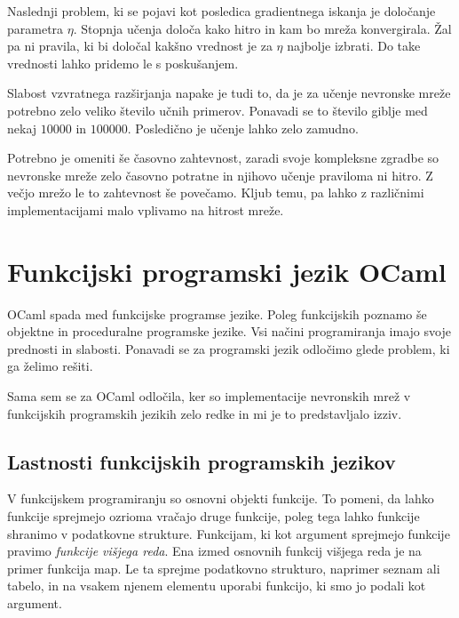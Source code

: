 \documentclass[mat1]{fmfdelo}
\begin{document}
Naslednji problem, ki se pojavi kot posledica gradientnega iskanja je določanje parametra $\eta$. Stopnja učenja določa kako hitro in kam bo mreža konvergirala. Žal pa ni pravila, ki bi določal kakšno vrednost je za $\eta$ najbolje izbrati. Do take vrednosti lahko pridemo le s poskušanjem.

Slabost vzvratnega razširjanja napake je tudi to, da je za učenje nevronske mreže potrebno zelo veliko število učnih primerov. Ponavadi se to število giblje med nekaj $10000$ in $100000$. Posledično je učenje lahko zelo zamudno.

Potrebno je omeniti še časovno zahtevnost, zaradi svoje kompleksne zgradbe so nevronske mreže zelo časovno potratne in njihovo učenje praviloma ni hitro. Z večjo mrežo le to zahtevnost še povečamo. Kljub temu, pa lahko z različnimi implementacijami malo vplivamo na hitrost mreže.
%
%
%
\section{Funkcijski programski jezik OCaml}
OCaml spada med funkcijske programse jezike. Poleg funkcijskih poznamo še objektne in proceduralne programske jezike. Vsi načini programiranja imajo svoje prednosti in slabosti. Ponavadi se za programski jezik odločimo glede problem, ki ga želimo rešiti. 

Sama sem se za OCaml odločila, ker so implementacije nevronskih mrež v funkcijskih programskih jezikih zelo redke in mi je to predstavljalo izziv. 
%
\subsection{Lastnosti funkcijskih programskih jezikov}
V funkcijskem programiranju so osnovni objekti funkcije. To pomeni, da lahko funkcije sprejmejo ozrioma vračajo druge funkcije, poleg tega lahko funkcije shranimo v podatkovne strukture. Funkcijam, ki kot argument sprejmejo funkcije pravimo \emph{funkcije višjega reda}. Ena izmed osnovnih funkcij višjega reda je na primer funkcija map. Le ta sprejme podatkovno strukturo, naprimer seznam ali tabelo, in na vsakem njenem elementu uporabi funkcijo, ki smo jo podali kot argument.
\end{document}
